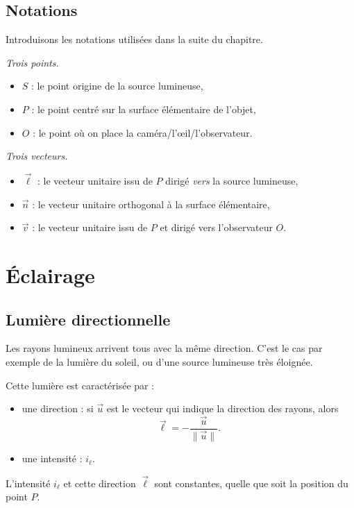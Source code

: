 \documentclass[11pt,class=report,crop=false]{standalone}
\begin{document}
\subsection{Notations}

Introduisons les notations utilisées dans la suite du chapitre.




\emph{Trois points.}
\begin{itemize}
  \item $S$ : le point origine de la source lumineuse,
  \item $P$ : le point centré sur la surface élémentaire de l'objet,
  \item $O$ : le point où on place la caméra/l'\oe{}il/l'observateur.
\end{itemize}

\medskip
\emph{Trois vecteurs.}
\begin{itemize}
  \item $\vec \ell$ : le vecteur unitaire issu de $P$ dirigé \emph{vers} la source lumineuse,
  \item $\vec n$ : le vecteur unitaire orthogonal à la surface élémentaire,
  \item $\vec v$ : le vecteur unitaire issu de $P$ et dirigé vers l'observateur $O$.
\end{itemize}


\section{Éclairage}


\subsection{Lumière directionnelle}

Les rayons lumineux arrivent tous avec la même direction. C'est le cas par exemple de la lumière du soleil, ou d'une source lumineuse très éloignée.


Cette lumière est caractérisée par :
\begin{itemize}
  \item une direction : si $\vec u$ est le vecteur qui indique la direction des rayons, alors 
$$\vec\ell = -\frac{\vec u}{\|\vec u\|}.$$
  \item une intensité : $i_\ell$.
\end{itemize}
L'intensité $i_\ell$ et cette direction $\vec \ell $ sont constantes, quelle que soit la position du point $P$.
\end{document}
